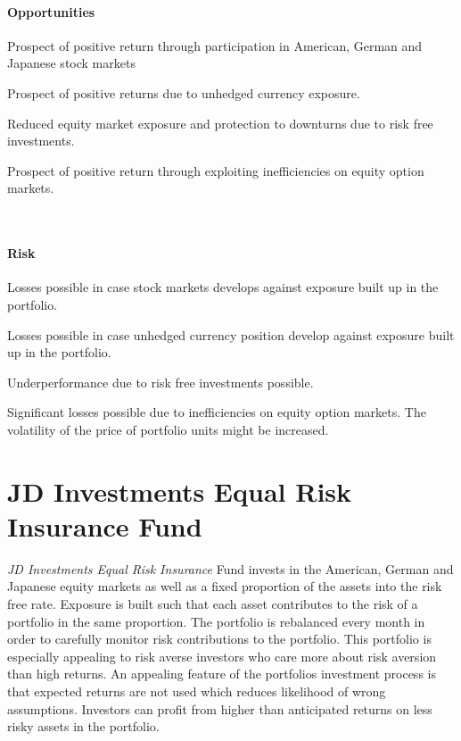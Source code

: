 \documentclass[11pt, parskip=full, DIV=14]{scrreprt}
\begin{document}
\begin{minipage}[t]{0.49\textwidth}
  \paragraph{Opportunities}
  \begin{sit}
    \item Prospect of positive return through participation in American, German and Japanese stock markets
    \item Prospect of positive returns due to unhedged currency exposure.
    \item Reduced equity market exposure and protection to downturns due to risk free investments.
    \item Prospect of positive return through exploiting inefficiencies on equity option markets.
  \end{sit}
\end{minipage}
~~
\begin{minipage}[t]{0.49\textwidth}
  \paragraph{Risk}
  \begin{sit}
    \item Losses possible in case stock markets develops against exposure built up in the portfolio.
    \item Losses possible in case unhedged currency position develop against exposure built up in the portfolio.
    \item Underperformance due to risk free investments possible.
    \item Significant losses possible due to inefficiencies on equity option markets. The volatility of the price of portfolio units might be increased.
  \end{sit}
\end{minipage}

\newpage\section*{JD Investments Equal Risk Insurance Fund}
\textit{JD Investments Equal Risk Insurance} Fund invests in the American, German and Japanese equity markets as well as a fixed proportion of the assets into the risk free rate.
Exposure is built such that each asset contributes to the risk of a portfolio in the same proportion.
The portfolio is rebalanced every month in order to carefully monitor risk contributions to the portfolio.
This portfolio is especially appealing to risk averse investors who care more about risk aversion than high returns.
An appealing feature of the portfolios investment process is that expected returns are not used which reduces likelihood of wrong assumptions.
Investors can profit from higher than anticipated returns on less risky assets in the portfolio.
 
\end{document}

